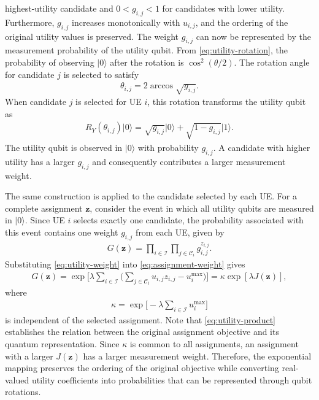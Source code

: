 \documentclass[journal]{IEEEtran}
\newcommand{\ket}[1]{\lvert #1 \rangle}
\begin{document}
{{highest-utility candidate and $0<g_{i,j}<1$ for candidates with lower utility. Furthermore, $g_{i,j}$ increases monotonically with $u_{i,j}$,
and the ordering of the original utility values is preserved.
The weight $g_{i,j}$ can now be represented by the measurement probability of the utility qubit. From \eqref{eq:utility-rotation}, the
probability of observing $\ket{0}$ after the rotation is $\cos^2(\theta/2)$. The rotation angle for candidate $j$ is selected to satisfy
\begin{align}
\theta_{i,j}=2\arccos\sqrt{g_{i,j}}.
\label{eq:utility-angle}
\end{align}
When candidate $j$ is selected for UE $i$, this rotation transforms the utility qubit as
\begin{align}
R_Y(\theta_{i,j})\ket{0}
=\sqrt{g_{i,j}}\ket{0}
+\sqrt{1-g_{i,j}}\ket{1}.
\label{eq:utility-state}
\end{align}
The utility qubit is observed in $\ket{0}$ with probability $g_{i,j}$. A candidate with higher utility has a larger $g_{i,j}$ and
consequently contributes a larger measurement weight.

The same construction is applied to the candidate selected by each UE. For a complete assignment $\bm z$, consider the event in which all
utility qubits are measured in $\ket{0}$. Since UE $i$ selects exactly one candidate, the probability associated with this event contains one
weight $g_{i,j}$ from each UE, given by
\begin{align}
G(\bm z)
=\prod_{i\in\mathcal{I}}
\prod_{j\in\mathcal{C}_i}g_{i,j}^{z_{i,j}}.
\label{eq:assignment-weight}
\end{align}
Substituting \eqref{eq:utility-weight} into \eqref{eq:assignment-weight} gives
\begin{align}
G(\bm z)=\exp\!\Big[\lambda\sum_{i\in\mathcal{I}}\Big(\sum_{j\in\mathcal{C}_i}u_{i,j}z_{i,j}-u_i^{\max}\Big)\Big]=\kappa\exp\!\left[\lambda J(\bm z)\right],
\label{eq:utility-product}
\end{align}
where
\begin{align}
\kappa=\exp\!\Big[-\lambda\sum_{i\in\mathcal{I}}u_i^{\max}\Big]
\label{eq:utility-constant}
\end{align}
is independent of the selected assignment. Note that \eqref{eq:utility-product} establishes the relation between the original assignment objective and its quantum representation. Since $\kappa$ is common to all assignments, an assignment with a larger $J(\bm z)$ has a larger measurement weight. Therefore, the exponential mapping preserves the ordering of the original objective while converting real-valued utility coefficients into probabilities that can be represented through qubit rotations.

}}
\end{document}

